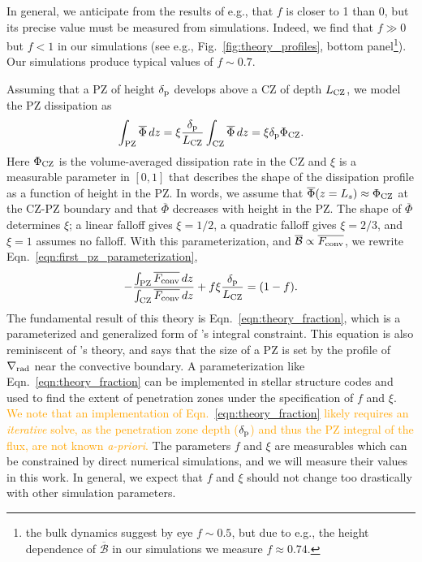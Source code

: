 \documentclass[twocolumn, linenumbers]{aastex631}
\newcommand{\gradrad}{\ensuremath{\nabla_{\rm{rad}}}}
\newcommand{\delp}{\ensuremath{\delta_{\rm{p}}}}
\newcommand{\Fconv}{\ensuremath{F_{\rm{conv}}}}
\renewcommand{\bar}[1]{\overline{#1}}
\newcommand{\editone}[1]{\textcolor{orange}{#1}}
\begin{document}
In general, we anticipate from the results of e.g., \citet{currie_browning_2017} that $f$ is closer to 1 than 0, but its precise value must be measured from simulations.
Indeed, we find that $f \gg 0$ but $f < 1$ in our simulations (see e.g., Fig.~\ref{fig:theory_profiles}, bottom panel\footnote{the bulk dynamics suggest by eye $f \sim 0.5$, but due to e.g., the height dependence of $\bar{\mathcal{B}}$ in our simulations we measure $f \approx 0.74$.}).
Our simulations produce typical values of $f \sim 0.7$.

Assuming that a PZ of height $\delp$ develops above a CZ of depth $L_{\rm{CZ}}$, we model the PZ dissipation as
\begin{equation}
\int_{\rm{PZ}} \bar{\Phi}\,dz = \xi\frac{\delp}{L_{\rm{CZ}}}\int_{\rm{CZ}}\bar{\Phi}\,dz = \xi \delp \Phi_{\rm{CZ}}.
\label{eqn:xi_defn}
\end{equation}
Here $\Phi_{\rm{CZ}}$ is the volume-averaged dissipation rate in the CZ and $\xi$ is a measurable parameter in ${[0, 1]}$ that describes the shape of the dissipation profile as a function of height in the PZ.
In words, we assume that $\bar{\Phi}(z = L_s) \approx \Phi_{\rm{CZ}}$ at the CZ-PZ boundary and that $\bar{\Phi}$ decreases with height in the PZ.
The shape of $\bar{\Phi}$ determines $\xi$; a linear falloff gives $\xi = 1/2$, a quadratic falloff gives $\xi = 2/3$, and $\xi = 1$ assumes no falloff.
With this parameterization, and $\bar{\mathcal{B}} \propto \bar{\Fconv}$, we rewrite Eqn.~\ref{eqn:first_pz_parameterization},
\begin{equation}
-\frac{\int_{\rm{PZ}}\bar{\Fconv}\,dz}{\int_{\rm{CZ}}\bar{\Fconv}\,dz} + f\xi\frac{\delp}{L_{\rm{CZ}}}
= (1 - f).
\label{eqn:theory_fraction}
\end{equation}
The fundamental result of this theory is Eqn.~\ref{eqn:theory_fraction}, which is a parameterized and generalized form of \citet{roxburgh1989}'s integral constraint.
This equation is also reminiscent of \citet{zahn1991}'s theory, and says that the size of a PZ is set by the profile of $\gradrad$ near the convective boundary.
A parameterization like Eqn.~\ref{eqn:theory_fraction} can be implemented in stellar structure codes and used to find the extent of penetration zones under the specification of $f$ and $\xi$.
\editone{
    We note that an implementation of Eqn.~\ref{eqn:theory_fraction} likely requires an \emph{iterative} solve, as the penetration zone depth ($\delp$) and thus the PZ integral of the flux, are not known \emph{a-priori}.
}
The parameters $f$ and $\xi$ are measurables which can be constrained by direct numerical simulations, and we will measure their values in this work.
In general, we expect that $f$ and $\xi$ should not change too drastically with other simulation parameters.
\end{document}
